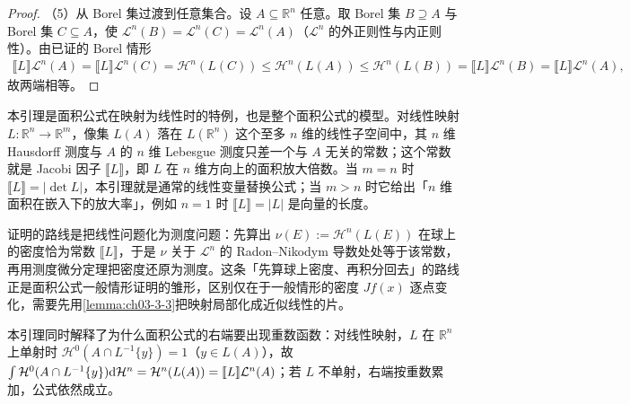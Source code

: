\documentclass[../../main.tex]{subfiles}%
\begin{document}
\begin{proof}
（5）从 Borel 集过渡到任意集合。设 $A\subseteq\mathbb{R}^n$ 任意。取 Borel 集 $B\supseteq A$ 与 Borel 集 $C\subseteq A$，使 $\mathcal{L}^n(B)=\mathcal{L}^n(C)=\mathcal{L}^n(A)$（$\mathcal{L}^n$ 的外正则性与内正则性）。由已证的 Borel 情形
\begin{align*}
\llbracket L\rrbracket\mathcal{L}^n(A)=\llbracket L\rrbracket\mathcal{L}^n(C)=\mathcal{H}^n(L(C))\leqslant\mathcal{H}^n(L(A))\leqslant\mathcal{H}^n(L(B))=\llbracket L\rrbracket\mathcal{L}^n(B)=\llbracket L\rrbracket\mathcal{L}^n(A),
\end{align*}
故两端相等。
\end{proof}

\begin{remark}\label{remark:ch03-lem-3-1-动机}
本引理是面积公式在映射为线性时的特例，也是整个面积公式的模型。对线性映射 $L:\mathbb{R}^n\to\mathbb{R}^m$，像集 $L(A)$ 落在 $L(\mathbb{R}^n)$ 这个至多 $n$ 维的线性子空间中，其 $n$ 维 Hausdorff 测度与 $A$ 的 $n$ 维 Lebesgue 测度只差一个与 $A$ 无关的常数；这个常数就是 Jacobi 因子 $\llbracket L\rrbracket$，即 $L$ 在 $n$ 维方向上的面积放大倍数。当 $m=n$ 时 $\llbracket L\rrbracket=\lvert\det L\rvert$，本引理就是通常的线性变量替换公式；当 $m>n$ 时它给出「$n$ 维面积在嵌入下的放大率」，例如 $n=1$ 时 $\llbracket L\rrbracket=\lvert L\rvert$ 是向量的长度。

证明的路线是把线性问题化为测度问题：先算出 $\nu(E):=\mathcal{H}^n(L(E))$ 在球上的密度恰为常数 $\llbracket L\rrbracket$，于是 $\nu$ 关于 $\mathcal{L}^n$ 的 Radon--Nikodym 导数处处等于该常数，再用测度微分定理把密度还原为测度。这条「先算球上密度、再积分回去」的路线正是面积公式一般情形证明的雏形，区别仅在于一般情形的密度 $Jf(x)$ 逐点变化，需要先用\cref{lemma:ch03-3-3}把映射局部化成近似线性的片。%

本引理同时解释了为什么面积公式的右端要出现重数函数：对线性映射，$L$ 在 $\mathbb{R}^n$ 上单射时 $\mathcal{H}^0(A\cap L^{-1}\{y\})=1$（$y\in L(A)$），故 $\int\mathcal{H}^0(A\cap L^{-1}\{y\})\mathrm{d}\mathcal{H}^n=\mathcal{H}^n(L(A))=\llbracket L\rrbracket\mathcal{L}^n(A)$；若 $L$ 不单射，右端按重数累加，公式依然成立。
\end{remark}
\end{document}

